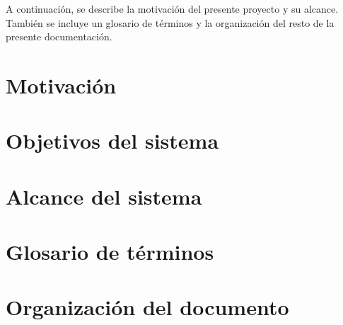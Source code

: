 

A continuación, se describe la motivación del presente proyecto y su alcance. También se incluye un glosario de términos y la organización del resto de la presente documentación.

\section{Motivación}
\label{sec:motivation}


\section{Objetivos del sistema}
\label{sec:objectives}


\section{Alcance del sistema}
\label{sec:scope}


\section{Glosario de términos} 
\label{sec:glossary}


\section{Organización del documento}
\label{sec:document-organization}

